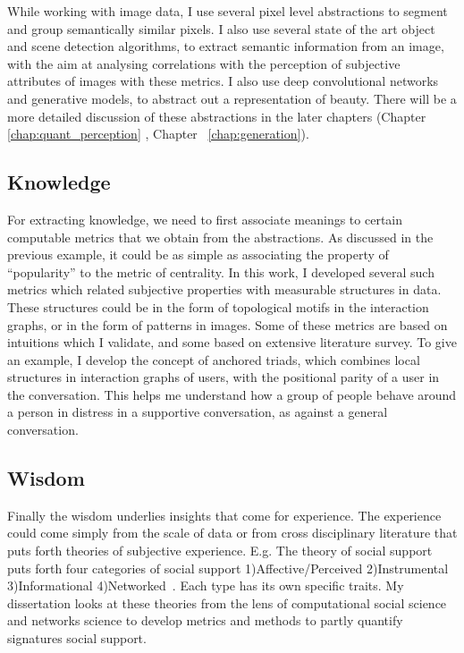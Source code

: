 While working with image data, I use several pixel level abstractions to segment and group semantically similar pixels. I also use several state of the art object and scene detection algorithms, to extract semantic information from an image, with the aim at analysing correlations with the perception of subjective attributes of images with these metrics. I also use deep convolutional networks and generative models, to abstract out a representation of beauty. There will be a more detailed discussion of these abstractions in the later chapters (Chapter \ref{chap:quant_perception} , Chapter ~\ref{chap:generation}).  

\subsection{Knowledge}
For extracting knowledge, we need to first associate meanings to certain computable metrics that we obtain from the abstractions. As discussed in the previous example, it could be as simple as associating the property of ``popularity'' to the metric of centrality. In this work, I developed several such metrics which related subjective properties with measurable structures in data. These structures could be in the form of topological motifs in the interaction graphs, or in the form of patterns in images. Some of these metrics are based on intuitions which I validate, and some based on extensive literature survey. To give an example, I develop the concept of anchored triads, which combines local structures in interaction graphs of users, with the positional parity of a user in the conversation. This helps me understand how a group of people behave around a person in distress in a supportive conversation, as against a general conversation.

\subsection{Wisdom}
Finally the wisdom underlies insights that come for experience. The experience could come simply from the scale of data or from cross disciplinary literature that puts forth theories of subjective experience. E.g. The theory of social support puts forth four categories of social support 1)Affective/Perceived 2)Instrumental 3)Informational 4)Networked~\cite{cutrona1992controllability}. Each type has its own specific traits. My dissertation looks at these theories from the lens of computational social science and networks science to develop metrics and methods to partly quantify signatures social support.


